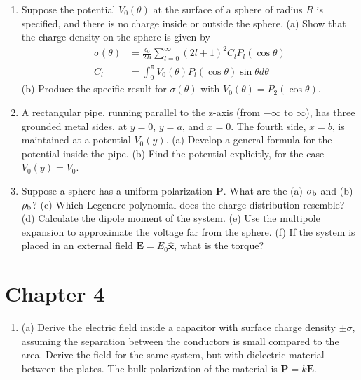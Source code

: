 \documentclass[10pt]{article}
\begin{document}
\begin{enumerate}
\item Suppose the potential $V_0(\theta)$ at the surface of a sphere of radius $R$ is specified, and there is no charge inside or outside the sphere.  (a) Show that the charge density on the sphere is given by
\begin{align}
\sigma(\theta) &= \frac{\epsilon_0}{2R} \sum_{l=0}^{\infty} (2l+1)^2 C_l P_l(\cos\theta) \\
C_l &= \int_0^{\pi} V_0(\theta) P_l (\cos\theta) \sin\theta d\theta
\end{align}
(b) Produce the specific result for $\sigma(\theta)$ with $V_0(\theta) = P_2(\cos\theta)$.
\item A rectangular pipe, running parallel to the z-axis (from $-\infty$ to $\infty$), has three grounded metal sides, at $y=0$, $y=a$, and $x=0$.  The fourth side, $x=b$, is maintained at a potential $V_0(y)$. (a) Develop a general formula for the potential inside the pipe. (b) Find the potential explicitly, for the case $V_0(y) = V_0$.
\item Suppose a sphere has a uniform polarization $\mathbf{P}$.  What are the (a) $\sigma_{\rm b}$ and (b) $\rho_{\rm b}$? (c) Which Legendre polynomial does the charge distribution resemble? (d) Calculate the dipole moment of the system.  (e) Use the multipole expansion to approximate the voltage far from the sphere.  (f) If the system is placed in an external field $\mathbf{E} = E_0 \hat{\mathbf{x}}$, what is the torque?
\end{enumerate}

\section{Chapter 4}

\begin{enumerate}
\item (a) Derive the electric field inside a capacitor with surface charge density $\pm \sigma$, assuming the separation between the conductors is small compared to the area.  Derive the field for the same system, but with dielectric material between the plates.  The bulk polarization of the material is $\mathbf{P} = k\mathbf{E}$.
\end{enumerate}
\end{document}
